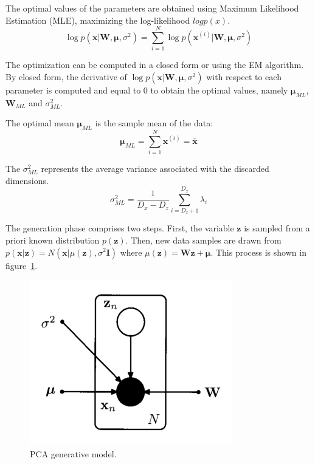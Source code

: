 \documentclass[5p,sort&compress]{elsarticle}
\begin{document}
The optimal values of the parameters are obtained using Maximum Likelihood Estimation (MLE), maximizing the log-likelihood $log p(x)$.
\begin{equation}
\log p\left(\boldsymbol{x} | \boldsymbol{W},\boldsymbol{\mu}, \sigma^{2}\right)=\sum_{i=1}^{N} \log p\left(\boldsymbol{x}^{(i)} | \boldsymbol{W}, \boldsymbol{\mu}, \sigma^{2}\right)
\end{equation}

The optimization can be computed in a closed form or using the EM algorithm. By closed form, the derivative of $\log p\left(\boldsymbol{x} | \boldsymbol{W}, \boldsymbol{\mu},\sigma^{2}\right)$ with respect to each parameter is computed and equal to 0 to obtain the optimal values, namely $\boldsymbol{\mu}_{ML}$, $\boldsymbol{W}_{ML}$ and $\sigma^2_{ML}$.

The optimal mean $\boldsymbol{\mu}_{ML}$ is the sample mean of the data:
\begin{equation}
\boldsymbol{\mu}_{ML}=\sum_{i=1}^{N} \boldsymbol{x}^{(i)}=\bar{\boldsymbol{x}}
\end{equation}

The $\sigma^2_{ML}$ represents the average variance associated with the discarded dimensions.
\begin{equation}
\sigma_{M L}^{2}=\frac{1}{D_{x}-D_{z}} \sum_{i=D_{z}+1}^{D_{x}} \lambda_{i}
\end{equation}

The generation phase comprises two steps. First, the variable $\boldsymbol{z}$ is sampled from a priori known distribution $p(\boldsymbol{z})$. Then, new data samples are drawn from $p(\boldsymbol{x}|\boldsymbol{z}) = N(\boldsymbol{x}|\mu(\boldsymbol{z}), \sigma^2 \boldsymbol{I})$ where $\mu(\boldsymbol{z}) = \boldsymbol{W}\boldsymbol{z} + \boldsymbol{\mu}$. This process is shown in figure~\ref{fig:PCA}.

\begin{figure}[ht]
     \centering
     \includegraphics[width = 0.7\linewidth]{figure/PCA_generative.png}
     \caption{PCA generative model.}
     \label{fig:PCA}
\end{figure}
\end{document}
